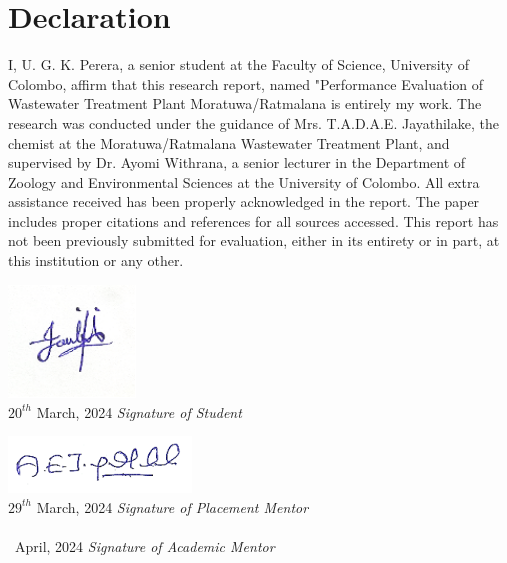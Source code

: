 \newpage
\section*{\centering Declaration}

  \vspace{0.5cm}

I, U. G. K. Perera, a senior student at the Faculty of Science, University of Colombo, affirm that this research report, named "Performance Evaluation of Wastewater Treatment Plant Moratuwa/Ratmalana is entirely my work. The research was conducted under the guidance of Mrs. T.A.D.A.E. Jayathilake, the chemist at the Moratuwa/Ratmalana Wastewater Treatment Plant, and supervised by Dr. Ayomi Withrana, a senior lecturer in the Department of Zoology and Environmental Sciences at the University of Colombo. All extra assistance received has been properly acknowledged in the report. The paper includes proper citations and references for all sources accessed. This report has not been previously submitted for evaluation, either in its entirety or in part, at this institution or any other.

  \vspace{2cm}

 


 \hspace*{\fill} \includegraphics[height=3cm]{assets/sign_gavini.png} \\
 \hspace{0.5cm} $20^{th}$ March, 2024  \hspace*{\fill} \textit{Signature of Student}\\

  \vspace{0.5cm}

  \hspace*{\fill} \includegraphics[height=1.5cm]{assets/sign_placement_mentor.png} \\
  \hspace{1cm} $29^{th}$ March, 2024 \hspace*{\fill} \textit{Signature of Placement Mentor}\\

  \hspace*{\fill}  \\
  \hspace{1cm} \  April, 2024 \hspace*{\fill} \textit{Signature of Academic Mentor}  \\


\clearpage